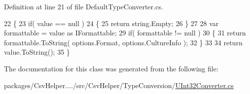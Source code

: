 Definition at line 21 of file Default\-Type\-Converter.\-cs.


\begin{DoxyCode}
22         \{
23             \textcolor{keywordflow}{if}( value == null )
24             \{
25                 \textcolor{keywordflow}{return} string.Empty;
26             \}
27 
28             var formattable = value as IFormattable;
29             \textcolor{keywordflow}{if}( formattable != null )
30             \{
31                 \textcolor{keywordflow}{return} formattable.ToString( options.Format, options.CultureInfo );
32             \}
33 
34             \textcolor{keywordflow}{return} value.ToString();
35         \}
\end{DoxyCode}


The documentation for this class was generated from the following file\-:\begin{DoxyCompactItemize}
\item 
packages/\-Csv\-Helper..../src/\-Csv\-Helper/\-Type\-Conversion/\hyperlink{a00288}{U\-Int32\-Converter.\-cs}\end{DoxyCompactItemize}
